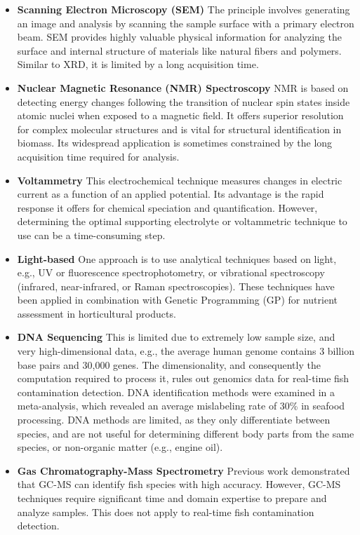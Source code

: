 \begin{itemize}
\item \textbf{Scanning Electron Microscopy (SEM)} The principle involves generating an image and analysis by scanning the sample surface with a primary electron beam. SEM provides highly valuable physical information for analyzing the surface and internal structure of materials like natural fibers and polymers. Similar to XRD, it is limited by a long acquisition time.
\item \textbf{Nuclear Magnetic Resonance (NMR) Spectroscopy} NMR is based on detecting energy changes following the transition of nuclear spin states inside atomic nuclei when exposed to a magnetic field. It offers superior resolution for complex molecular structures and is vital for structural identification in biomass. Its widespread application is sometimes constrained by the long acquisition time required for analysis.
\item \textbf{Voltammetry} This electrochemical technique measures changes in electric current as a function of an applied potential. Its advantage is the rapid response it offers for chemical speciation and quantification. However, determining the optimal supporting electrolyte or voltammetric technique to use can be a time-consuming step.
\item \textbf{Light-based} One approach is to use analytical techniques based on light, e.g., UV or fluorescence spectrophotometry, or vibrational spectroscopy (infrared, near-infrared, or Raman spectroscopies). These techniques have been applied in combination with Genetic Programming (GP) for nutrient assessment in horticultural products.
\item \textbf{DNA Sequencing} This is limited due to extremely low sample size, and very high-dimensional data, e.g., the average human genome contains 3 billion base pairs and 30,000 genes. The dimensionality, and consequently the computation required to process it, rules out genomics data for real-time fish contamination detection. DNA identification methods were examined in a meta-analysis, which revealed an average mislabeling rate of 30\% in seafood processing. DNA methods are limited, as they only differentiate between species, and are not useful for determining different body parts from the same species, or non-organic matter (e.g., engine oil).
\item \textbf{Gas Chromatography-Mass Spectrometry} Previous work demonstrated that GC-MS can identify fish species with high accuracy. However, GC-MS techniques require significant time and domain expertise to prepare and analyze samples. This does not apply to real-time fish contamination detection.
\end{itemize}

